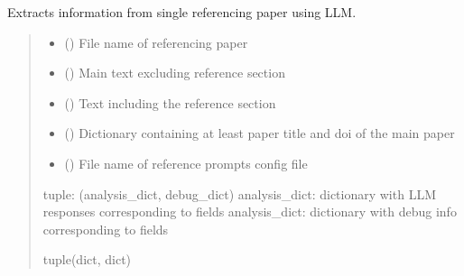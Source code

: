 \documentclass[letterpaper,10pt,english]{sphinxmanual}
\begin{document}
\begin{fulllineitems}
\label{\detokenize{reference_analysis:reference_analysis.analyze_reference}}
\pysigstartsignatures
\pysiglinewithargsret
{}
{\sphinxparamcomma {}\sphinxparamcomma {}\sphinxparamcomma {}\sphinxparamcomma {}}
{}
\pysigstopsignatures
\sphinxAtStartPar
Extracts information from single referencing paper using LLM.
\begin{quote}\begin{description}
\begin{itemize}
\item {} 
\sphinxAtStartPar
{} () \textendash{} File name of referencing paper

\item {} 
\sphinxAtStartPar
{} () \textendash{} Main text excluding reference section

\item {} 
\sphinxAtStartPar
{} () \textendash{} Text including the reference section

\item {} 
\sphinxAtStartPar
{} () \textendash{} Dictionary containing at least paper title and doi of the main paper

\item {} 
\sphinxAtStartPar
{} () \textendash{} File name of reference prompts config file

\end{itemize}

\sphinxAtStartPar
tuple: (analysis\_dict, debug\_dict)
analysis\_dict: dictionary with LLM responses corresponding to fields
analysis\_dict: dictionary with debug info corresponding to fields

\sphinxAtStartPar
tuple(dict, dict)

\end{description}\end{quote}

\end{fulllineitems}
\end{document}
